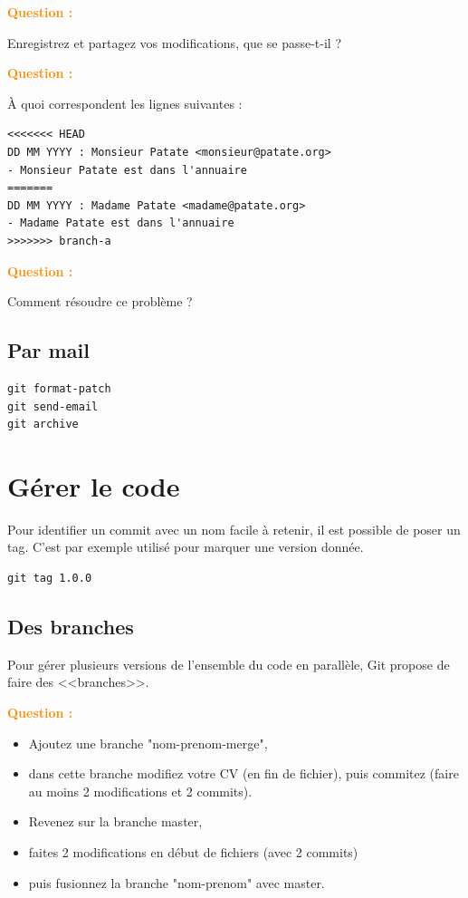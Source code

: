 \documentclass[a4paper]{article}
\newcounter{question}
\newcommand{\q}{
  \textcolor{DarkOrange}{\textbf{Question \thequestion : }}
  \addtocounter{question}{1}
  \newline
}
\begin{document}
\q Enregistrez et partagez vos modifications, que se passe-t-il ? 

\q À quoi correspondent les lignes suivantes : 
\begin{verbatim}
<<<<<<< HEAD
DD MM YYYY : Monsieur Patate <monsieur@patate.org>
- Monsieur Patate est dans l'annuaire
=======
DD MM YYYY : Madame Patate <madame@patate.org>
- Madame Patate est dans l'annuaire
>>>>>>> branch-a
\end{verbatim}

\q Comment résoudre ce problème ?

\subsection* {Par mail}

\begin{verbatim}
git format-patch
git send-email
git archive
\end{verbatim}

\section*{Gérer le code}

Pour identifier un commit avec un nom facile à retenir, il est possible de poser un tag. C'est par exemple utilisé pour marquer une version donnée.

\begin{verbatim}
git tag 1.0.0
\end{verbatim}

\subsection*{Des branches}

Pour gérer plusieurs versions de l'ensemble du code en parallèle, Git propose de faire des <<branches>>.

\q
\begin{itemize}
  \item Ajoutez une branche "nom-prenom-merge", 
  \item dans cette branche modifiez votre CV (en fin de fichier), puis commitez (faire au moins 2 modifications et 2 commits). 
  \item Revenez sur la branche master, 
  \item faites 2 modifications en début de fichiers (avec 2 commits) 
  \item puis fusionnez la branche "nom-prenom" avec master.
\end{itemize}
\end{document}
